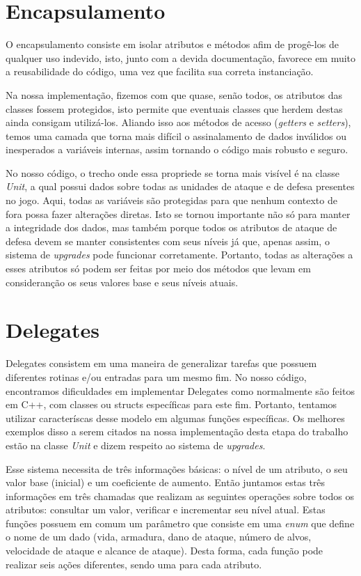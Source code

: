 \documentclass[rel_mlp]{iiufrgs}
\begin{document}
\section{Encapsulamento} 
O encapsulamento consiste em isolar atributos e métodos afim de progê-los de qualquer uso indevido, isto, junto com a devida documentação, favorece em muito a reusabilidade do código, uma vez que facilita sua correta instanciação.
	
	Na nossa implementação, fizemos com que quase, senão todos, os atributos das classes fossem protegidos, isto permite que eventuais classes que herdem destas ainda consigam utilizá-los. Aliando isso aos métodos de acesso (\textit{getters} e \textit{setters}), temos uma camada que torna mais difícil o assinalamento de dados inválidos ou inesperados a variáveis internas, assim tornando o código mais robusto e seguro.
	
 	No nosso código, o trecho onde essa propriede se torna mais visível é na classe \textit{Unit}, a qual possui dados sobre todas as unidades de ataque e de defesa presentes no jogo. Aqui, todas as variáveis são protegidas para que nenhum contexto de fora possa fazer alterações diretas. Isto se tornou importante não só para manter a integridade dos dados, mas também porque todos os atributos de ataque de defesa devem se manter consistentes com seus níveis já que, apenas assim, o sistema de \textit{upgrades} pode funcionar corretamente. Portanto, todas as alterações a esses atributos só podem ser feitas por meio dos métodos que levam em consideranção os seus valores base e seus níveis atuais. 
 	
\section{Delegates}
 
 	Delegates consistem em uma maneira de generalizar tarefas que possuem diferentes rotinas e/ou entradas para um mesmo fim. No nosso código, encontramos dificuldades em implementar Delegates como normalmente são feitos em C++, com classes ou structs específicas para este fim. Portanto, tentamos utilizar caracteríscas desse modelo em algumas funções específicas. Os melhores exemplos disso a serem citados na nossa implementação desta etapa do trabalho estão na classe \textit{Unit} e dizem respeito ao sistema de \textit{upgrades}. 
 	
 	Esse sistema necessita de três informações básicas: o nível de um atributo, o seu valor base (inicial) e um coeficiente de aumento. Então juntamos estas três informações em três chamadas que realizam as seguintes operações sobre todos os atributos: consultar um valor, verificar e incrementar seu nível atual. Estas funções possuem em comum um parâmetro que consiste em uma \textit{enum} que define o nome de um dado (vida, armadura, dano de ataque, número de alvos, velocidade de ataque e alcance de ataque). Desta forma, cada função pode realizar seis ações diferentes, sendo uma para cada atributo.
\end{document}
